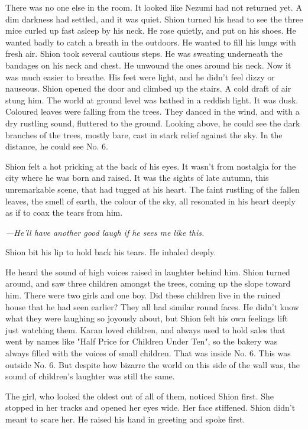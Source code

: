 There was no one else in the room. It looked like Nezumi had not
returned yet. A dim darkness had settled, and it was quiet. Shion turned
his head to see the three mice curled up fast asleep by his neck. He
rose quietly, and put on his shoes. He wanted badly to catch a breath in
the outdoors. He wanted to fill his lungs with fresh air. Shion took
several cautious steps. He was sweating underneath the bandages on his
neck and chest. He unwound the ones around his neck. Now it was much
easier to breathe. His feet were light, and he didn't feel dizzy or
nauseous. Shion opened the door and climbed up the stairs. A cold draft
of air stung him. The world at ground level was bathed in a reddish
light. It was dusk. Coloured leaves were falling from the trees. They
danced in the wind, and with a dry rustling sound, fluttered to the
ground. Looking above, he could see the dark branches of the trees,
mostly bare, cast in stark relief against the sky. In the distance, he
could see No. 6.

Shion felt a hot pricking at the back of his eyes. It wasn't from
nostalgia for the city where he was born and raised. It was the sights
of late autumn, this unremarkable scene, that had tugged at his heart.
The faint rustling of the fallen leaves, the smell of earth, the colour
of the sky, all resonated in his heart deeply as if to coax the tears
from him.

\emph{---He'll have another good laugh if he sees me like this.}

Shion bit his lip to hold back his tears. He inhaled deeply.

He heard the sound of high voices raised in laughter behind him. Shion
turned around, and saw three children amongst the trees, coming up the
slope toward him. There were two girls and one boy. Did these children
live in the ruined house that he had seen earlier? They all had similar
round faces. He didn't know what they were laughing so joyously about,
but Shion felt his own feelings lift just watching them. Karan loved
children, and always used to hold sales that went by names like "Half
Price for Children Under Ten", so the bakery was always filled with the
voices of small children. That was inside No. 6. This was outside No. 6.
But despite how bizarre the world on this side of the wall was, the
sound of children's laughter was still the same.

The girl, who looked the oldest out of all of them, noticed Shion first.
She stopped in her tracks and opened her eyes wide. Her face stiffened.
Shion didn't meant to scare her. He raised his hand in greeting and
spoke first.

